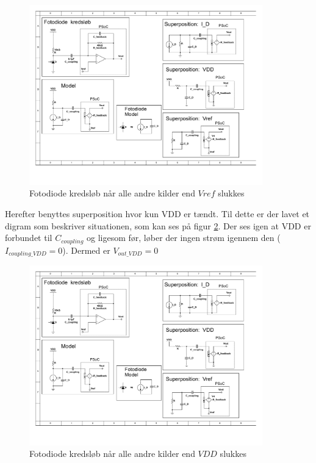 \documentclass[HardwareDesign/HardwareDesign_main.tex]{subfiles}
\begin{document}
\begin{figure}[H]
    \centering
    \includegraphics[width=0.9\textwidth,trim={6.3in 1.3in 1in 5in},clip, page=1]{HardwareDesign/CupSensor/graphics/Superposition.pdf}
    \caption{Fotodiode kredsløb når alle andre kilder end $Vref$ slukkes}
    \label{fig:photodiodeSPVref}
\end{figure}

Herefter benyttes superposition hvor kun VDD er tændt. Til dette er der lavet et digram som beskriver situationen, som kan ses på figur \ref{fig:photodiodeSPVDD}. Der ses igen at VDD er forbundet til $C_{coupling}$ og ligesom før, løber der ingen strøm igennem den ($I_{coupling\_VDD}=0$). Dermed er $V_{out\_VDD}=0$

\begin{figure}[H]
    \centering
    \includegraphics[width=0.9\textwidth,trim={6.3in 3.5in 0.8in 2.7in},clip, page=1]{HardwareDesign/CupSensor/graphics/Superposition.pdf}
    \caption{Fotodiode kredsløb når alle andre kilder end $VDD$ slukkes}
    \label{fig:photodiodeSPVDD}
\end{figure}
\end{document}
